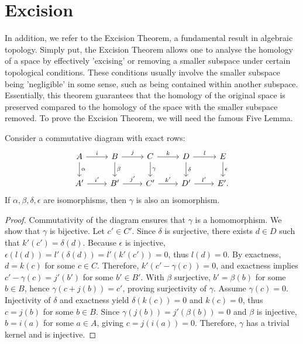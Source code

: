 \section{Excision}
\label{ExcisionTheorem}
In addition, we refer to the Excision Theorem, a fundamental result in algebraic topology. Simply put, the Excision Theorem allows one to analyse the homology of a space by effectively 'excising' or removing a smaller subspace under certain topological conditions. These conditions usually involve the smaller subspace being 'negligible' in some sense, such as being contained within another subspace. Essentially, this theorem guarantees that the homology of the original space is preserved compared to the homology of the space with the smaller subspace removed. To prove the Excision Theorem, we will need the famous Five Lemma.
\begin{lemma}{\cite[Exercise 1.3.3]{Weibel1994}}
	\label{fivelemma} Consider a commutative diagram with exact rows:
	\begin{equation}
		\begin{tikzcd}
			A \arrow[r, "i"] \arrow[d, "\alpha"] & B \arrow[r, "j"] \arrow[d, "\beta"]
			& C \arrow[r, "k"] \arrow[d, "\gamma"] & D \arrow[r, "l"] \arrow[d, "\delta"]
			& E \arrow[d, "\epsilon"] \\ A' \arrow[r, "i'"] & B' \arrow[r, "j'"] & C'
			\arrow[r, "k'"] & D' \arrow[r, "l'"] & E'.
		\end{tikzcd}
	\end{equation}
	If $\alpha, \beta, \delta, \epsilon$ are isomorphisms, then $\gamma$ is also an
	isomorphism.
\end{lemma}

\begin{proof}
	Commutativity of the diagram ensures that $\gamma$ is a homomorphism. We show that $\gamma$ is bijective. Let $c' \in C'$. Since $\delta$ is surjective, there exists $d \in D$ such that $k'(c') = \delta(d)$. Because $\epsilon$ is injective, $\epsilon(l(d)) = l'(\delta(d)) = l'(k'(c')) = 0$, thus $l(d) = 0$. By exactness, $d = k(c)$ for some $c \in C$. Therefore, $k'(c' - \gamma(c)) = 0$, and exactness implies $c' - \gamma(c) = j'(b')$ for some $b' \in B'$. With $\beta$ surjective, $b' = \beta(b)$ for some $b \in B$, hence $\gamma(c + j(b)) = c'$, proving surjectivity of $\gamma$. Assume $\gamma(c) = 0$. Injectivity of $\delta$ and exactness yield $\delta(k(c)) = 0$ and $k(c) = 0$, thus $c = j(b)$ for some $b \in B$. Since $\gamma(j(b)) = j'(\beta(b)) = 0$ and $\beta$ is injective, $b = i(a)$ for some $a \in A$, giving $c = j(i(a)) = 0$. Therefore, $\gamma$ has a trivial kernel and is injective.
\end{proof}

